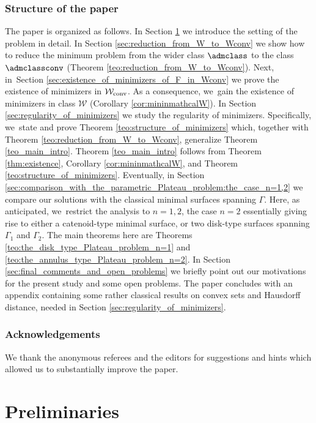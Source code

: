 \subsubsection*{Structure of the paper} The paper is organized as follows.
In Section \ref{sec:preliminaries} we introduce the
setting of the problem in detail.
In Section
\ref{sec:reduction_from_W_to_Wconv}
we show how to reduce the minimum problem
from the wider class $\admclass$ to the class $\admclassconv$
(Theorem \ref{teo:reduction_from_W_to_Wconv}).
Next,
in~Section
\ref{sec:existence_of_minimizers_of_F_in_Wconv}
we prove the existence of minimizers in $\mathcal
W_{\textup{conv}}$. As a consequence, we~gain
the existence of minimizers in class $\mathcal W$ (Corollary \ref{cor:mininmathcalW}).
In Section
\ref{sec:regularity_of_minimizers} we study the regularity of minimizers. Specifically, we~state and prove Theorem \ref{teo:structure_of_minimizers}
which, together with Theorem \ref{teo:reduction_from_W_to_Wconv}, generalize Theorem \ref{teo_main_intro}. Theorem \ref{teo_main_intro}
follows from Theorem \ref{thm:existence}, Corollary \ref{cor:mininmathcalW}, and Theorem \ref{teo:structure_of_minimizers}.
Eventually, in Section \ref{sec:comparison_with_the_parametric_Plateau_problem:the_case_n=1,2}
we compare our solutions with the classical minimal surfaces spanning $\Gamma$. Here, as anticipated, we~restrict the analysis to $n=1,2$,
the case $n=2$ essentially giving rise to either a catenoid-type minimal surface, or two disk-type surfaces spanning $\Gamma_1$ and $\Gamma_2$. The main theorems here are Theorems \ref{teo:the_disk_type_Plateau_problem_n=1} and \ref{teo:the_annulus_type_Plateau_problem_n=2}.
In Section \ref{sec:final_comments_and_open_problems}
we briefly point out our motivations for the present study and some open problems.
The paper concludes with an appendix containing some rather classical
results on convex sets and Hausdorff distance, needed in
Section \ref{sec:regularity_of_minimizers}.

\subsubsection*{Acknowledgements}
We thank the anonymous referees and the editors for suggestions and hints which allowed us to substantially improve the paper.

\section{Preliminaries}\label{sec:preliminaries}

